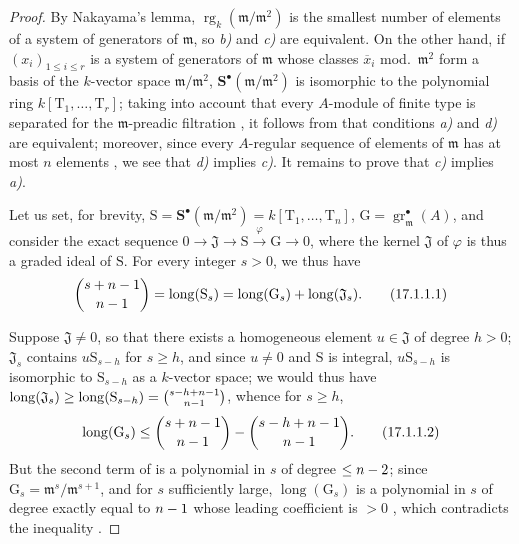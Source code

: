 \begin{proof}
By Nakayama's lemma, $\operatorname{rg}_k(\mathfrak{m}/\mathfrak{m}^2)$ is the smallest number of elements of a system of generators of $\mathfrak{m}$, so \emph{b)} and \emph{c)} are equivalent.
On the other hand, if $(x_i)_{1\leq i\leq r}$ is a system of generators of $\mathfrak{m}$ whose classes $\overline{x}_i$ mod.~$\mathfrak{m}^2$ form a basis of the $k$-vector space $\mathfrak{m}/\mathfrak{m}^2$, $\mathbf{S}^\bullet(\mathfrak{m}/\mathfrak{m}^2)$ is isomorphic to the polynomial ring $k[\mathrm{T}_1,\ldots,\mathrm{T}_r]$;
taking into account that every $A$-module of finite type is separated for the $\mathfrak{m}$-preadic filtration , it follows from  that conditions \emph{a)} and \emph{d)} are equivalent;
moreover, since every $A$-regular sequence of elements of $\mathfrak{m}$ has at most $n$ elements , we see that \emph{d)} implies \emph{c)}.
It remains to prove that \emph{c)} implies \emph{a)}.

Let us set, for brevity, $\mathrm{S}=\mathbf{S}^\bullet(\mathfrak{m}/\mathfrak{m}^2)=k[\mathrm{T}_1,\ldots,\mathrm{T}_n]$, $\mathrm{G}=\operatorname{gr}^\bullet_\mathfrak{m}(A)$, and consider the exact sequence $0\to\mathfrak{J}\to\mathrm{S}\xrightarrow{\varphi}\mathrm{G}\to 0$, where the kernel $\mathfrak{J}$ of $\varphi$ is thus a graded ideal of $\mathrm{S}$.
For every integer $s>0$, we thus have
\[
\label{0.17.1.1.1}
  \binom{s+n- 1}{n- 1}=\operatorname{long}(\mathrm{S}_s)=\operatorname{long}(\mathrm{G}_s)+\operatorname{long}(\mathfrak{J}_s).
  \tag{17.1.1.1}
\]

Suppose $\mathfrak{J}\neq 0$, so that there exists a homogeneous element $u\in\mathfrak{J}$ of degree $h>0$;
$\mathfrak{J}_s$ contains $u\mathrm{S}_{s-h}$ for $s\geq h$, and since $u\neq 0$ and $\mathrm{S}$ is integral, $u\mathrm{S}_{s-h}$ is isomorphic to $\mathrm{S}_{s-h}$ as a $k$-vector space;
we would thus have $\operatorname{long}(\mathfrak{J}_s)\geq\operatorname{long}(\mathrm{S}_{s-h})=\binom{s- h+n- 1}{n- 1}$, whence for $s\geq h$,
\[
\label{0.17.1.1.2}
  \operatorname{long}(\mathrm{G}_s)\leq\binom{s+n- 1}{n- 1}-\binom{s- h+n- 1}{n- 1}.
  \tag{17.1.1.2}
\]
But the second term of  is a polynomial in $s$ of degree $\leq n- 2$;
since $\mathrm{G}_s=\mathfrak{m}^s/\mathfrak{m}^{s+1}$, and for $s$ sufficiently large, $\operatorname{long}(\mathrm{G}_s)$ is a polynomial in $s$ of degree exactly equal to $n- 1$ whose leading coefficient is $>0$ , which contradicts the inequality .
\end{proof}

